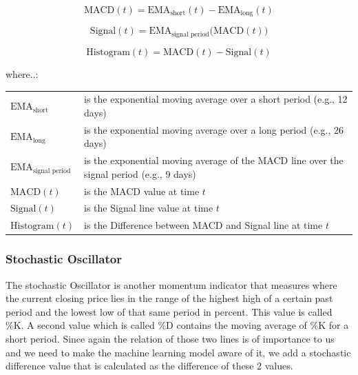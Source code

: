 \documentclass[a4paper,12pt]{report}
\begin{document}
\begin{equation}
\text{MACD}(t) = \text{EMA}_{\text{short}}(t) - \text{EMA}_{\text{long}}(t)
\end{equation}

\begin{equation}
\text{Signal}(t) = \text{EMA}_{\text{signal period}} \big(\text{MACD}(t)\big)
\end{equation}

\begin{equation}
\text{Histogram}(t) = \text{MACD}(t) - \text{Signal}(t)
\end{equation}

where..:\\

\begin{tabularx}{\textwidth}{@{}l@{\hspace{2em}--\hspace{2em}}X@{}}
  $\text{EMA}_{\text{short}}$       & is the exponential moving average over a short period (e.g., 12 days) \\
  $\text{EMA}_{\text{long}}$        & is the exponential moving average over a long period (e.g., 26 days) \\
  $\text{EMA}_{\text{signal period}}$ & is the exponential moving average of the MACD line over the signal period (e.g., 9 days) \\
  $\text{MACD}(t)$                  & is the MACD value at time $t$ \\
  $\text{Signal}(t)$                & is the Signal line value at time $t$ \\
  $\text{Histogram}(t)$             & is the Difference between MACD and Signal line at time $t$ \\
\end{tabularx}

			\subsubsection{Stochastic Oscillator}
			
The stochastic Oscillator is another momentum indicator that measures where the current closing price lies in the range of the highest high of a certain past period and the lowest low of that same period in percent. This value is called \%K. A second value which is called \%D contains the moving average of \%K for a short period. Since again the relation of those two lines is of importance to us and we need to make the machine learning model aware of it, we add a stochastic difference value that is calculated as the difference of these 2 values. \cite{25}\\
\end{document}
